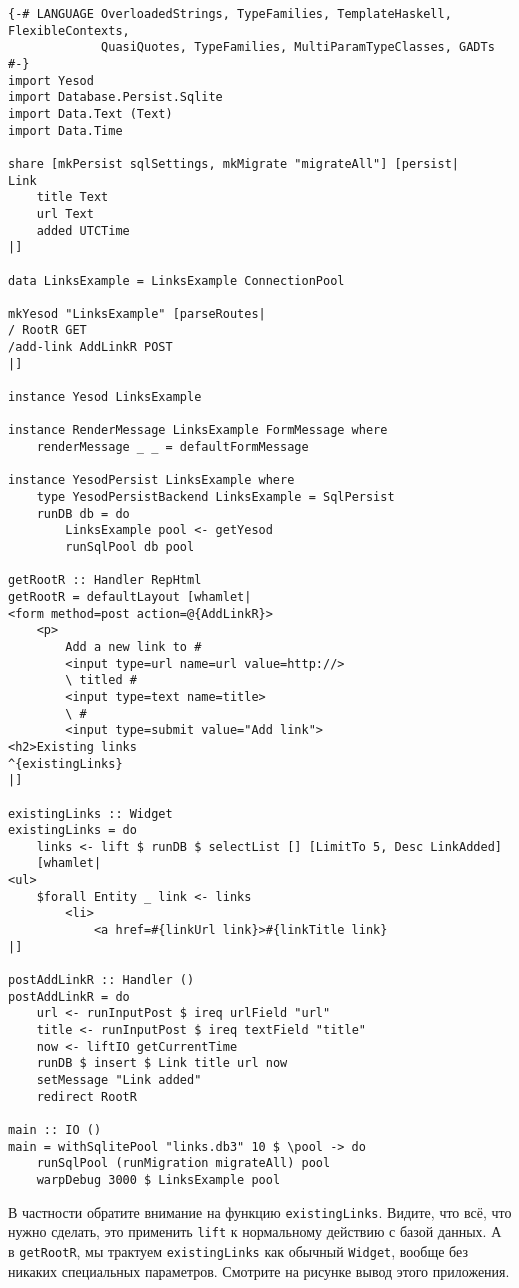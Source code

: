 \begin{lstlisting}
{-# LANGUAGE OverloadedStrings, TypeFamilies, TemplateHaskell, FlexibleContexts,
             QuasiQuotes, TypeFamilies, MultiParamTypeClasses, GADTs #-}
import Yesod
import Database.Persist.Sqlite
import Data.Text (Text)
import Data.Time

share [mkPersist sqlSettings, mkMigrate "migrateAll"] [persist|
Link
    title Text
    url Text
    added UTCTime
|]

data LinksExample = LinksExample ConnectionPool

mkYesod "LinksExample" [parseRoutes|
/ RootR GET
/add-link AddLinkR POST
|]

instance Yesod LinksExample

instance RenderMessage LinksExample FormMessage where
    renderMessage _ _ = defaultFormMessage

instance YesodPersist LinksExample where
    type YesodPersistBackend LinksExample = SqlPersist
    runDB db = do
        LinksExample pool <- getYesod
        runSqlPool db pool

getRootR :: Handler RepHtml
getRootR = defaultLayout [whamlet|
<form method=post action=@{AddLinkR}>
    <p>
        Add a new link to #
        <input type=url name=url value=http://>
        \ titled #
        <input type=text name=title>
        \ #
        <input type=submit value="Add link">
<h2>Existing links
^{existingLinks}
|]

existingLinks :: Widget
existingLinks = do
    links <- lift $ runDB $ selectList [] [LimitTo 5, Desc LinkAdded]
    [whamlet|
<ul>
    $forall Entity _ link <- links
        <li>
            <a href=#{linkUrl link}>#{linkTitle link}
|]

postAddLinkR :: Handler ()
postAddLinkR = do
    url <- runInputPost $ ireq urlField "url"
    title <- runInputPost $ ireq textField "title"
    now <- liftIO getCurrentTime
    runDB $ insert $ Link title url now
    setMessage "Link added"
    redirect RootR

main :: IO ()
main = withSqlitePool "links.db3" 10 $ \pool -> do
    runSqlPool (runMigration migrateAll) pool
    warpDebug 3000 $ LinksExample pool
\end{lstlisting}

В частности обратите внимание на функцию \lstinline'existingLinks'. Видите, что всё, что
нужно сделать, это применить \lstinline'lift' к нормальному действию с базой данных. А в
\lstinline'getRootR', мы трактуем \lstinline'existingLinks' как обычный
\lstinline'Widget', вообще без никаких специальных параметров. Смотрите на рисунке вывод
этого приложения.

